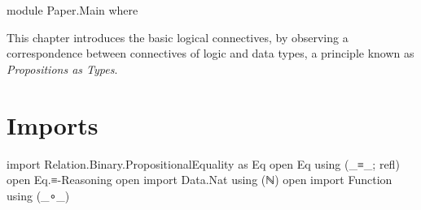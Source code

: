 \begin{code}[hide]
module Paper.Main where
\end{code}

This chapter introduces the basic logical connectives, by observing a
correspondence between connectives of logic and data types, a
principle known as \emph{Propositions as Types}.

\section{Imports}

\begin{code}
import Relation.Binary.PropositionalEquality as Eq
open Eq using (_≡_; refl)
open Eq.≡-Reasoning
open import Data.Nat using (ℕ)
open import Function using (_∘_)
\end{code}
